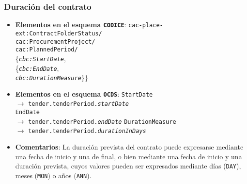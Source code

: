         \subsubsection{Duración del contrato}
            \begin{itemize}
                \item \textbf{Elementos en el esquema \texttt{CODICE}}:
                    \tabto{7.7cm} \texttt{cac-place-ext:ContractFolderStatus/} \\
                    \tabto{7.7cm} \texttt{cac:ProcurementProject/} \\
                    \tabto{7.7cm} \texttt{cac:PlannedPeriod/} \\
                    \tabto{7.7cm} \{\texttt{\textit{cbc:StartDate}}, \\
                    \tabto{7.7cm} \{\texttt{\textit{cbc:EndDate}}, \\
                    \tabto{7.7cm} \texttt{\textit{cbc:DurationMeasure}}\}\}
                \item \textbf{Elementos en el esquema \texttt{OCDS}}:
                    \tabto{7.7cm} \texttt{StartDate} \\ \tabto{8cm} $\rightarrow$ \texttt{tender.tenderPeriod.\textit{startDate}} \\
                    \tabto{7.7cm} \texttt{EndDate} \\ \tabto{8cm} $\rightarrow$ \texttt{tender.tenderPeriod.\textit{endDate}}
                    \tabto{7.7cm} \texttt{DurationMeasure} \\ \tabto{8cm} $\rightarrow$ \texttt{tender.tenderPeriod.\textit{durationInDays}}
                \item \textbf{Comentarios}: La duración prevista del contrato puede expresarse mediante una fecha de inicio y una de final, o bien mediante una fecha de inicio y una duración prevista, cuyos valores pueden ser expresados mediante días (\texttt{DAY}), meses (\texttt{MON}) o años (\texttt{ANN}).
            \end{itemize}
        
